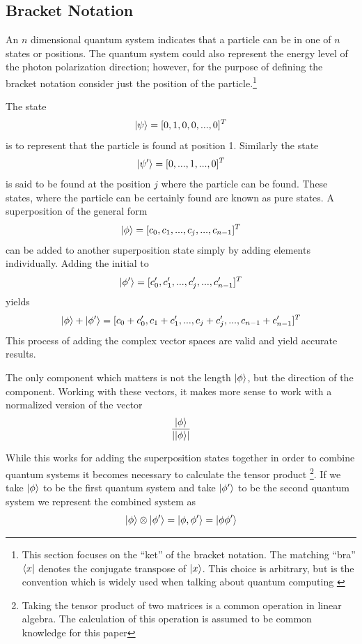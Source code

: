 \documentclass[12pt]{article}
\begin{document}
\subsection{Bracket Notation}
An $n$ dimensional quantum system indicates that a particle can be in one of $n$ states or positions. The quantum system could also represent the energy level of the photon polarization direction; however, for the purpose of defining the bracket notation consider just the position of the particle.\footnote{This section focuses on the ``ket'' of the bracket notation. The matching ``bra'' $\bra{x}$ denotes the conjugate transpose of $\ket{x}$. This choice is arbitrary, but is the convention which is widely used when talking about quantum computing \cite{non}}\par
The state $$\ket{\psi} = [0,1,0,0,...,0]^T$$ is to represent that the particle is found at position 1. Similarly the state $$\ket{\psi'} = [0,...,1,...,0]^T$$ is said to be found at the position $j$ where the particle can be found. These states, where the particle can be certainly found are known as pure states. A superposition of the general form $$\ket{\phi} = [c_0, c_1,...,c_{j},...,c_{n-1}]^T$$ can be added to another superposition state simply by adding elements individually. Adding the initial to $$\ket{\phi'} = [c_0', c_1',...,c_{j}',...,c'_{n-1}]^T$$ yields
$$\ket{\phi} + \ket{\phi'} = [c_0+c_0', c_1+c_1', ..., c_{j}+c'_{j},..., c_{n-1} + c'_{n-1}]^T$$ This process of adding the complex vector spaces are valid and yield accurate results.\par
The only component which matters is not the length $\ket{\phi}$, but the direction of the component. Working with these vectors, it makes more sense to work with a normalized version of the vector $$\frac{\ket{\phi}}{\left|\ket{\phi}\right|}$$\par

While this works for adding the superposition states together in order to combine quantum systems it becomes necessary to calculate the tensor product \footnote{Taking the tensor product of two matrices is a common operation in linear algebra. The calculation of this operation is assumed to be common knowledge for this paper}. If we take $\ket{\phi}$ to be the first quantum system and take $\ket{\phi'}$ to be the second quantum system we represent the combined system as $$\ket{\phi}\otimes\ket{\phi'} = \ket{\phi, \phi'} = \ket{\phi \phi'}$$
\end{document}
